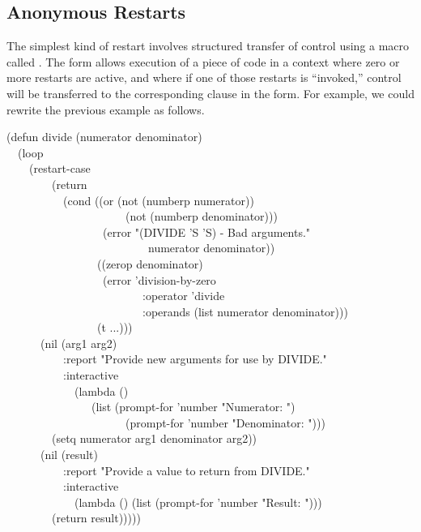 \subsection{Anonymous Restarts}

The simplest kind of restart involves structured transfer of control using
a macro called . The  form allows execution of
a piece of code in a context where zero or more restarts are active, and
where if one of those restarts is ``invoked,'' control will be transferred
to the corresponding clause in the  form. For example, we could
rewrite the previous  example as follows.
\begin{lisp}
(defun divide (numerator denominator) \\
~~(loop \\
~~~~(restart-case \\
~~~~~~~~(return \\
~~~~~~~~~~(cond ((or (not (numberp numerator)) \\
~~~~~~~~~~~~~~~~~~~~~(not (numberp denominator))) \\
~~~~~~~~~~~~~~~~~(error "(DIVIDE '{\Xtilde}S '{\Xtilde}S) - Bad arguments." \\
~~~~~~~~~~~~~~~~~~~~~~~~~numerator denominator)) \\
~~~~~~~~~~~~~~~~((zerop denominator) \\
~~~~~~~~~~~~~~~~~(error 'division-by-zero \\
~~~~~~~~~~~~~~~~~~~~~~~~:operator 'divide \\
~~~~~~~~~~~~~~~~~~~~~~~~:operands (list numerator denominator))) \\
~~~~~~~~~~~~~~~~(t ...))) \\
~~~~~~(nil (arg1 arg2) \\
~~~~~~~~~~:report "Provide new arguments for use by DIVIDE." \\
~~~~~~~~~~:interactive \\
~~~~~~~~~~~~(lambda () \\
~~~~~~~~~~~~~~~(list (prompt-for 'number "Numerator: ") \\
~~~~~~~~~~~~~~~~~~~~~(prompt-for 'number "Denominator: "))) \\
~~~~~~~~(setq numerator arg1 denominator arg2)) \\
~~~~~~(nil (result) \\
~~~~~~~~~~:report "Provide a value to return from DIVIDE." \\
~~~~~~~~~~:interactive \\
~~~~~~~~~~~~(lambda () (list (prompt-for 'number "Result: "))) \\
~~~~~~~~(return result)))))
\end{lisp}

